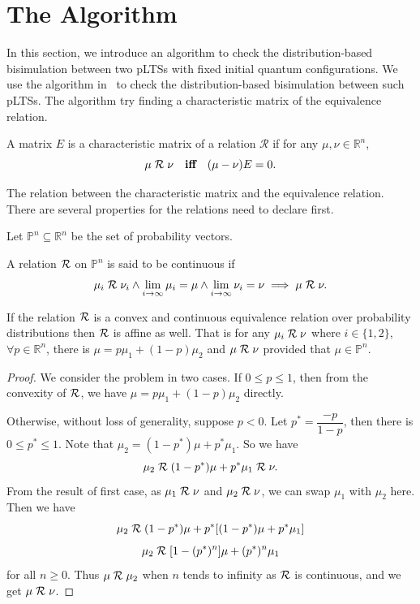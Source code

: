 \documentclass[runningheads]{llncs}
\begin{document}
\section{The Algorithm}
\label{sec:distribution-based bisimulation algorithm}
In this section, we introduce an algorithm to check the distribution-based bisimulation between two pLTSs with fixed initial quantum configurations. We use the algorithm in~\cite{HKK14} to check the distribution-based bisimulation between such pLTSs. The algorithm try finding a characteristic matrix of the equivalence relation.

\begin{definition}\label{def:chara_matrix}
A matrix $E$ is a characteristic matrix of a relation $\mathcal{R}$ if for any $\mu,\nu\in\mathbb{R}^{n}$,
\[\mu\mathrel{{\mathcal R }}\nu~~~\textbf{iff}~~~(\mu-\nu)E=0.\]
\end{definition}

The relation between the characteristic matrix and the equivalence relation. There are several properties for the relations need to declare first. 

Let $\mathbb{P}^{n}\subseteq\mathbb{R}^{n}$ be the set of probability vectors.
\begin{definition}\label{def:continuous_relation}
A relation $\mathrel{{\mathcal R }}$ on $\mathbb{P}^{n}$ is said to be continuous if 
\[\mu_{i}\mathrel{{\mathcal R }}\nu_{i}\wedge\lim_{i\rightarrow\infty}\mu_{i}=\mu\wedge\lim_{i\rightarrow\infty}\nu_{i}=\nu\implies\mu\mathrel{{\mathcal R }}\nu.\]
\end{definition}

\begin{lemma}\label{lem:affine_relation}
If the relation $\mathrel{{\mathcal R }}$ is a convex and continuous equivalence relation over probability distributions then $\mathrel{{\mathcal R }}$ is affine as well. That is for any $\mu_{i}\mathrel{{\mathcal R }}\nu$ where $i\in\{1,2\}$, $\forall p\in\mathbb{R}^{n}$, there is $\mu=p\mu_{1}+(1-p)\mu_{2}$ and $\mu\mathrel{{\mathcal R }}\nu$ provided that $\mu\in\mathbb{P}^{n}$.
\begin{proof}
We consider the problem in two cases.
If $0\leq p\leq1$, then from the convexity of $\mathrel{{\mathcal R }}$, we have $ \mu=p\mu_{1}+(1-p)\mu_{2}$ directly.

Otherwise, without loss of generality, suppose $p<0$. Let $p^{*}=\dfrac{-p}{1-p}$, then there is $0\leq p^{*}\leq1$. Note that $\mu_{2}=(1-p^{*})\mu+p^{*}\mu_{1}$. So we have 
\[\mu_{2}\mathrel{{\mathcal R }}(1-p^{*})\mu+p^{*}\mu_{1}\mathrel{{\mathcal R }}\nu.\]
From the result of first case, as $\mu_{1}\mathrel{{\mathcal R }}\nu$ and $\mu_{2}\mathrel{{\mathcal R }}\nu$, we can swap $\mu_{1}$ with $\mu_{2}$ here.
Then we have
\[\mu_{2}\mathrel{{\mathcal R }}(1-p^{*})\mu+p^{*}[(1-p^{*})\mu+p^{*}\mu_{1}]\]
\[\mu_{2}\mathrel{{\mathcal R }}[1-(p^{*})^{n}]\mu+(p^{*})^{n}\mu_{1}\]
for all $n\geq 0$.
Thus $\mu\mathrel{{\mathcal R }}\mu_2$ when $n$ tends to infinity as $\mathrel{{\mathcal R }}$ is continuous, and we get $\mu\mathrel{{\mathcal R }}\nu$.
\end{proof}
\end{lemma}
\end{document}
